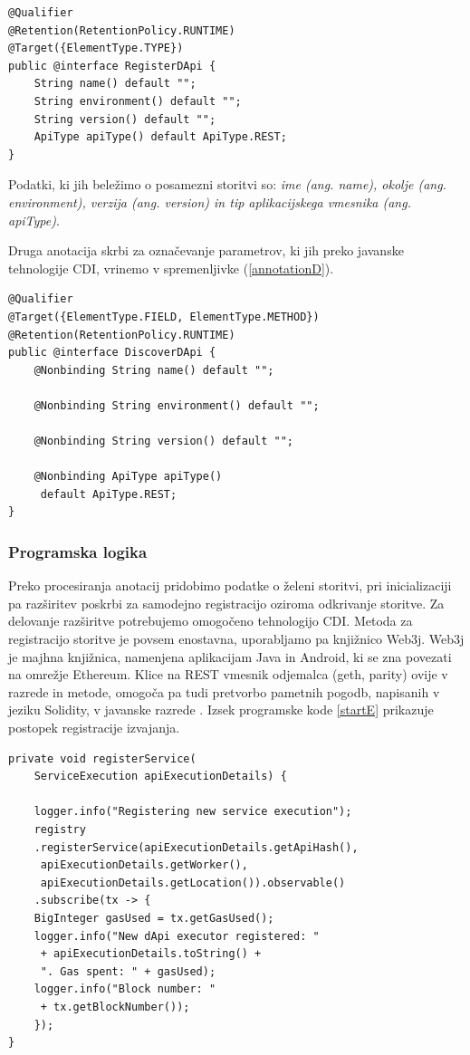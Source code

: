 \documentclass[a4paper, 12pt]{book}
\begin{document}
\begin{lstlisting}[caption={Anotacija za registracijo},captionpos=b,label={annotationReg}]
@Qualifier
@Retention(RetentionPolicy.RUNTIME)
@Target({ElementType.TYPE})
public @interface RegisterDApi {
	String name() default "";
	String environment() default "";
	String version() default "";
	ApiType apiType() default ApiType.REST;
}
\end{lstlisting}

Podatki, ki jih beležimo o posamezni storitvi so: \textit{ime (ang. name), okolje (ang. environment), verzija (ang. version) in tip aplikacijskega vmesnika (ang. apiType)}.


Druga anotacija skrbi za označevanje parametrov, ki jih preko javanske tehnologije CDI, vrinemo v spremenljivke (\ref{annotationD}).

\begin{lstlisting}[caption={Anotacija za deregistracijo},captionpos=b,label={annotationD}]
@Qualifier
@Target({ElementType.FIELD, ElementType.METHOD})
@Retention(RetentionPolicy.RUNTIME)
public @interface DiscoverDApi {
	@Nonbinding String name() default "";
	
	@Nonbinding String environment() default "";
	
	@Nonbinding String version() default "";
	
	@Nonbinding ApiType apiType()
	 default ApiType.REST;
}
\end{lstlisting}

\subsubsection{Programska logika}
Preko procesiranja anotacij pridobimo podatke o želeni storitvi, pri inicializaciji pa razširitev poskrbi za samodejno registracijo oziroma odkrivanje storitve.
Za delovanje razširitve potrebujemo omogočeno tehnologijo CDI.
Metoda za registracijo storitve je povsem enostavna, uporabljamo pa knjižnico Web3j.
Web3j je majhna knjižnica, namenjena aplikacijam Java in Android, ki se zna povezati na omrežje Ethereum.
Klice na REST vmesnik odjemalca (geth, parity) ovije v razrede in metode, omogoča pa tudi pretvorbo pametnih pogodb, napisanih v jeziku Solidity, v javanske razrede \cite{web3j}.
Izsek programske kode \ref{startE} prikazuje postopek registracije izvajanja.

\begin{lstlisting}[caption={Funckija za registracijo izvajanja storitve},captionpos=b,label={startE}]
private void registerService(
	ServiceExecution apiExecutionDetails) {
	
	logger.info("Registering new service execution");
	registry
	.registerService(apiExecutionDetails.getApiHash(),
	 apiExecutionDetails.getWorker(),
	 apiExecutionDetails.getLocation()).observable()
	.subscribe(tx -> {
	BigInteger gasUsed = tx.getGasUsed();
	logger.info("New dApi executor registered: "
	 + apiExecutionDetails.toString() + 
	 ". Gas spent: " + gasUsed);
	logger.info("Block number: "
	 + tx.getBlockNumber());
	});
}
\end{lstlisting}
\end{document}
